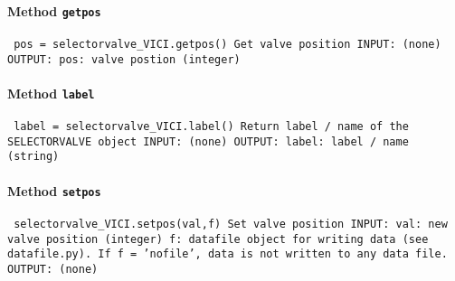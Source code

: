 \paragraph{Method \texttt{getpos}}
\vspace{1ex}
\texttt{\newline
pos = selectorvalve_VICI.getpos()\newline
\newline
Get valve position\newline
\newline
INPUT:\newline
(none)\newline
\newline
OUTPUT:\newline
pos: valve postion (integer)\newline
\newline
}

\paragraph{Method \texttt{label}}
\vspace{1ex}
\texttt{\newline
label = selectorvalve_VICI.label()\newline
\newline
Return label / name of the SELECTORVALVE object\newline
\newline
INPUT:\newline
(none)\newline
\newline
OUTPUT:\newline
label: label / name (string)\newline
\newline
}

\paragraph{Method \texttt{setpos}}
\vspace{1ex}
\texttt{\newline
selectorvalve_VICI.setpos(val,f)\newline
\newline
Set valve position\newline
\newline
INPUT:\newline
val: new valve position (integer)\newline
f: datafile object for writing data (see datafile.py). If f = 'nofile', data is not written to any data file.\newline
\newline
OUTPUT:\newline
(none)\newline
\newline
}

